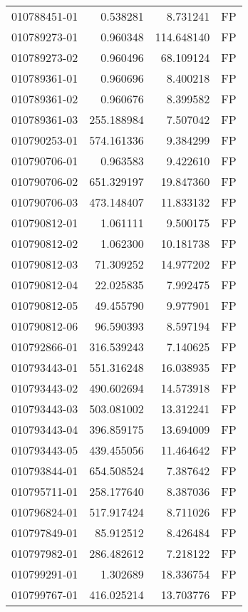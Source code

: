 \begin{tabular}{lrrl}
010788451-01 &    0.538281 &     8.731241 &   FP \\
010789273-01 &    0.960348 &   114.648140 &   FP \\
010789273-02 &    0.960496 &    68.109124 &   FP \\
010789361-01 &    0.960696 &     8.400218 &   FP \\
010789361-02 &    0.960676 &     8.399582 &   FP \\
010789361-03 &  255.188984 &     7.507042 &   FP \\
010790253-01 &  574.161336 &     9.384299 &   FP \\
010790706-01 &    0.963583 &     9.422610 &   FP \\
010790706-02 &  651.329197 &    19.847360 &   FP \\
010790706-03 &  473.148407 &    11.833132 &   FP \\
010790812-01 &    1.061111 &     9.500175 &   FP \\
010790812-02 &    1.062300 &    10.181738 &   FP \\
010790812-03 &   71.309252 &    14.977202 &   FP \\
010790812-04 &   22.025835 &     7.992475 &   FP \\
010790812-05 &   49.455790 &     9.977901 &   FP \\
010790812-06 &   96.590393 &     8.597194 &   FP \\
010792866-01 &  316.539243 &     7.140625 &   FP \\
010793443-01 &  551.316248 &    16.038935 &   FP \\
010793443-02 &  490.602694 &    14.573918 &   FP \\
010793443-03 &  503.081002 &    13.312241 &   FP \\
010793443-04 &  396.859175 &    13.694009 &   FP \\
010793443-05 &  439.455056 &    11.464642 &   FP \\
010793844-01 &  654.508524 &     7.387642 &   FP \\
010795711-01 &  258.177640 &     8.387036 &   FP \\
010796824-01 &  517.917424 &     8.711026 &   FP \\
010797849-01 &   85.912512 &     8.426484 &   FP \\
010797982-01 &  286.482612 &     7.218122 &   FP \\
010799291-01 &    1.302689 &    18.336754 &   FP \\
010799767-01 &  416.025214 &    13.703776 &   FP \\

\end{tabular}
